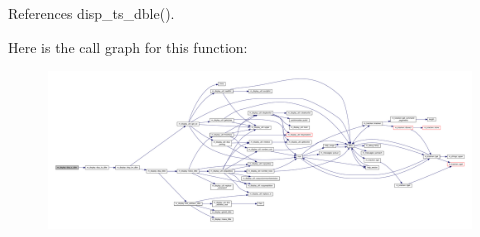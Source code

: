 References disp\+\_\+ts\+\_\+dble().

Here is the call graph for this function\+:
\nopagebreak
\begin{figure}[H]
\begin{center}
\leavevmode
\includegraphics[width=350pt]{namespacem__display_a8462e9d78a29a0658777c7af9eabd28c_cgraph}
\end{center}
\end{figure}
\mbox{\label{namespacem__display_a610ad67c4cfcad91bb6281b2c7ac3e07}} 
